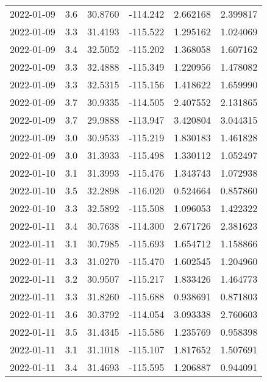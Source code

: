 \begin{tabular}{lrrrrr}
2022-01-09 &       3.6 &  30.8760 &  -114.242 &         2.662168 &         2.399817 \\
2022-01-09 &       3.3 &  31.4193 &  -115.522 &         1.295162 &         1.024069 \\
2022-01-09 &       3.4 &  32.5052 &  -115.202 &         1.368058 &         1.607162 \\
2022-01-09 &       3.3 &  32.4888 &  -115.349 &         1.220956 &         1.478082 \\
2022-01-09 &       3.3 &  32.5315 &  -115.156 &         1.418622 &         1.659990 \\
2022-01-09 &       3.7 &  30.9335 &  -114.505 &         2.407552 &         2.131865 \\
2022-01-09 &       3.7 &  29.9888 &  -113.947 &         3.420804 &         3.044315 \\
2022-01-09 &       3.0 &  30.9533 &  -115.219 &         1.830183 &         1.461828 \\
2022-01-09 &       3.0 &  31.3933 &  -115.498 &         1.330112 &         1.052497 \\
2022-01-10 &       3.1 &  31.3993 &  -115.476 &         1.343743 &         1.072938 \\
2022-01-10 &       3.5 &  32.2898 &  -116.020 &         0.524664 &         0.857860 \\
2022-01-10 &       3.3 &  32.5892 &  -115.508 &         1.096053 &         1.422322 \\
2022-01-11 &       3.4 &  30.7638 &  -114.300 &         2.671726 &         2.381623 \\
2022-01-11 &       3.1 &  30.7985 &  -115.693 &         1.654712 &         1.158866 \\
2022-01-11 &       3.3 &  31.0270 &  -115.470 &         1.602545 &         1.204960 \\
2022-01-11 &       3.2 &  30.9507 &  -115.217 &         1.833426 &         1.464773 \\
2022-01-11 &       3.3 &  31.8260 &  -115.688 &         0.938691 &         0.871803 \\
2022-01-11 &       3.6 &  30.3792 &  -114.054 &         3.093338 &         2.760603 \\
2022-01-11 &       3.5 &  31.4345 &  -115.586 &         1.235769 &         0.958398 \\
2022-01-11 &       3.1 &  31.1018 &  -115.107 &         1.817652 &         1.507691 \\
2022-01-11 &       3.4 &  31.4693 &  -115.595 &         1.206887 &         0.944091 \\

\end{tabular}
